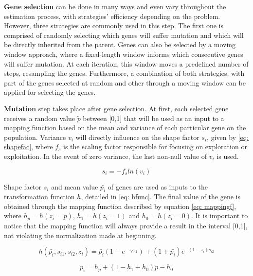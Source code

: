 \textbf{Gene selection} can be done in many ways and even vary throughout the estimation process, with strategies' efficiency depending on the problem. However, three strategies are commonly used in this step. The first one is comprised of randomly selecting which genes will suffer mutation and which will be directly inherited from the parent. Genes can also be selected by a moving window approach, where a fixed-length window informs which consecutive genes will suffer mutation. At each iteration, this window moves a predefined number of steps, resampling the genes. Furthermore, a combination of both strategies, with part of the genes selected at random and other through a moving window can be applied for selecting the genes.

\textbf{Mutation} step takes place after gene selection. At first, each selected gene receives a random value $\tilde{p}$ between [0,1] that will be used as an input to a mapping function based on the mean and variance of each particular gene on the population. Variance $v_{i}$ will directly influence on the shape factor $s_{i}$,  given by \eqref{eq: shapefac}, where $f_{s}$ is the scaling factor responsible for focusing on exploration or exploitation. In the event of zero variance, the last non-null value of $v_{i}$ is used.

\begin{equation}
	s_{i} = -f_{s}ln(v_{i})
	\label{eq: shapefac}
\end{equation}

Shape factor $s_{i}$ and mean value $\bar{p_{i}}$ of genes are used as inputs to the transformation function $h$, detailed in \eqref{eq: hfunc}. The final value of the gene is obtained through the mapping function described by equation \eqref{eq: mappingf}, where $h_{p} = h(z_{i} = \tilde{p})$, $h_{1} = h(z_{i} = 1)$ and $h_{0} = h(z_{i} = 0)$. It is important to notice that the mapping function will always provide a result in the interval [0,1], not violating the normalization made at beginning.

\begin{equation}
	h(\bar{p_{i}}, s_{i1}, s_{i2}, z_{i}) = \bar{p_{i}}(1 - e^{-z_{i}s_{i1}}) + (1 + \bar{p_{i}})e^{-(1 - z_{i})s_{i2}}
	\label{eq: hfunc}
\end{equation}

\begin{equation}
	p_{i} = h_{p} + (1 - h_{1} + h_{0})\tilde{p} - h_{0}
	\label{eq: mappingf}
\end{equation}

